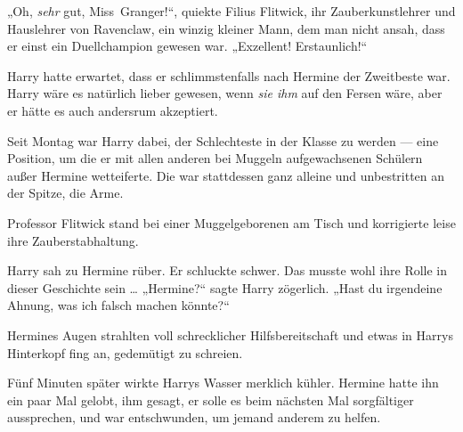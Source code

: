 „Oh, \emph{sehr} gut, Miss~Granger!“, quiekte Filius Flitwick, ihr Zauberkunstlehrer und Hauslehrer von Ravenclaw, ein winzig kleiner Mann, dem man nicht ansah, dass er einst ein Duellchampion gewesen war.
„Exzellent! Erstaunlich!“

Harry hatte erwartet, dass er schlimmstenfalls nach Hermine der Zweitbeste war. Harry wäre es natürlich lieber gewesen, wenn \emph{sie ihm} auf den Fersen wäre, aber er hätte es auch andersrum akzeptiert.

Seit Montag war Harry dabei, der Schlechteste in der Klasse zu werden — eine Position, um die er mit allen anderen bei Muggeln aufgewachsenen Schülern außer Hermine wetteiferte. Die war stattdessen ganz alleine und unbestritten an der Spitze, die Arme.

Professor Flitwick stand bei einer Muggelgeborenen am Tisch und korrigierte leise ihre Zauberstabhaltung.

Harry sah zu Hermine rüber. Er schluckte schwer. Das musste wohl ihre Rolle in dieser Geschichte sein …
„Hermine?“ sagte Harry zögerlich.
„Hast du irgendeine Ahnung, was ich falsch machen könnte?“

Hermines Augen strahlten voll schrecklicher Hilfsbereitschaft und etwas in Harrys Hinterkopf fing an, gedemütigt zu schreien.

Fünf Minuten später wirkte Harrys Wasser merklich kühler. Hermine hatte ihn ein paar Mal gelobt, ihm gesagt, er solle es beim nächsten Mal sorgfältiger aussprechen, und war entschwunden, um jemand anderem zu helfen.

